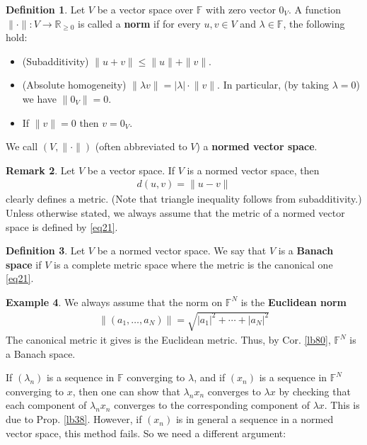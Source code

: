 \documentclass[12pt,b5paper,notitlepage]{article}
\theoremstyle{definition}
\newtheorem{df}{Definition}[section]
\newtheorem{eg}[df]{Example}
\newtheorem{rem}[df]{Remark}
\theoremstyle{plain}
\newcommand{\Rbb}{\mathbb R}
\newcommand{\Fbb}{\mathbb F}
\numberwithin{equation}{section}
\begin{document}
\begin{df}\label{lb91}
Let $V$ be a vector space over $\Fbb$ with zero vector $0_V$. A function $\lVert\cdot\lVert:V\rightarrow\Rbb_{\geq 0}$ is called a \textbf{norm}  if for every $u,v\in V$ and $\lambda\in\Fbb$, the following hold:
\begin{itemize}
\item (Subadditivity) $\lVert u+v\lVert\leq \lVert u\lVert+\lVert v\lVert$. 
\item (Absolute homogeneity) $\lVert\lambda v\lVert=|\lambda|\cdot \lVert v\lVert$. In particular, (by taking $\lambda=0$) we have $\lVert 0_V\lVert=0$.
\item If $\lVert v\lVert=0$ then $v=0_V$.
\end{itemize}
We call $(V,\lVert\cdot\lVert)$ (often abbreviated to $V$) a \textbf{normed vector space}. 
\end{df}

\begin{rem}
Let $V$ be a vector space. If $V$ is a normed vector space, then
\begin{align}
d(u,v)=\lVert u-v\lVert  \label{eq21}
\end{align} 
clearly defines a metric. (Note that triangle inequality follows from subadditivity.) Unless otherwise stated, we always assume that the metric of a normed vector space is defined by \eqref{eq21}.
\end{rem}




\begin{df}
Let $V$ be a normed vector space. We say that $V$ is a \textbf{Banach space}  if $V$ is a complete metric space where the metric is the canonical one \eqref{eq21}.
\end{df}




\begin{eg}
We always assume that the norm on $\Fbb^N$ is the \textbf{Euclidean norm} 
\begin{align}
\lVert (a_1,\dots,a_N)\lVert=\sqrt{|a_1|^2+\cdots+|a_N|^2}
\end{align}
The canonical metric it gives is the Euclidean metric. Thus, by Cor. \ref{lb80}, $\Fbb^N$ is a Banach space.
\end{eg}



If $(\lambda_n)$ is a sequence in $\Fbb$ converging to $\lambda$, and if $(x_n)$ is a sequence in $\Fbb^N$ converging to $x$, then one can show that $\lambda_nx_n$ converges to $\lambda x$ by checking that each component of $\lambda_nx_n$ converges to the corresponding component of $\lambda x$. This is due to Prop. \ref{lb38}. However, if $(x_n)$ is in general a sequence in a normed vector space, this method fails. So we need a different argument:
\end{document}
